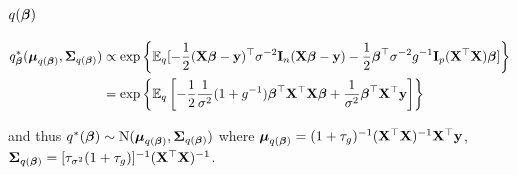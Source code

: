 \documentclass{amsart}[12pt]
\begin{document}
\subsection{$q({\boldsymbol \beta})$}

\begin{align*}
	q_{\boldsymbol \beta}^*({\boldsymbol \mu}_{q({\boldsymbol \beta})}, {\boldsymbol \Sigma}_{q({\boldsymbol \beta})}) & \propto \exp \left \{ \mathbb{E}_q[-\frac{1}{2} ({\bf X} {\boldsymbol \beta} - {\bf y})^\top \sigma^{-2} {\bf I}_n ({\bf X} {\boldsymbol \beta} - {\bf y}) - \frac{1}{2} {\boldsymbol \beta}^\top \sigma^{-2} g^{-1} {\bf I}_p ({\bf X}^\top {\bf X}) {\boldsymbol \beta}] \right \} \\
	                                                  & = \exp \left \{ \mathbb{E}_q \left[-\frac{1}{2} \frac{1}{\sigma^2} (1 + g^{-1}){\boldsymbol \beta}^\top {\bf X}^\top {\bf X} {\boldsymbol\beta} + \frac{1}{\sigma^2}{\boldsymbol \beta}^\top {\bf X}^\top {\bf y} \right] \right \}                    
\end{align*}

and thus
$q^*({\boldsymbol \beta}) \sim \text{N} ({\boldsymbol \mu}_{q({\boldsymbol \beta})}, {\boldsymbol \Sigma}_{q({\boldsymbol \beta})} )$
where ${\boldsymbol \mu}_{q({\boldsymbol \beta})} = (1 + \tau_g)^{-1} ({\bf X}^\top {\bf X})^{-1} {\bf X}^\top {\bf y}$,
${\boldsymbol \Sigma}_{q({\boldsymbol \beta})} = [\tau_{\sigma^2}(1 + \tau_{g})]^{-1}({\bf X}^\top {\bf X})^{-1}$.

\small
\end{document}
